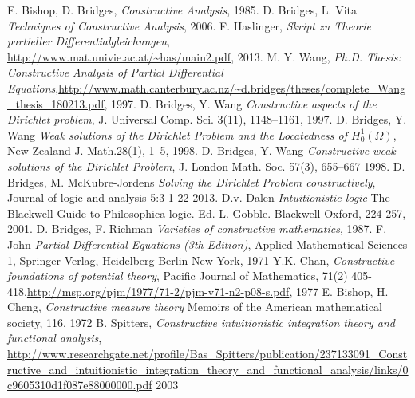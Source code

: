 \documentclass[11pt,a4paper,leqno]{report}
\numberwithin{equation}{chapter}
\begin{document}
\begin{thebibliography}{}
 E. Bishop, D. Bridges, {\em Constructive Analysis}, 1985.
 D. Bridges, L. Vita {\em Techniques of Constructive Analysis}, 2006.
 F. Haslinger, {\em Skript zu Theorie partieller Differentialgleichungen},\\ \url{http://www.mat.univie.ac.at/~has/main2.pdf}, 2013.
 M. Y. Wang, {\em Ph.D. Thesis: Constructive Analysis of Partial Differential Equations},\url{http://www.math.canterbury.ac.nz/~d.bridges/theses/complete_Wang_thesis_180213.pdf}, 1997.
 D. Bridges, Y. Wang {\em Constructive aspects of the Dirichlet problem}, J. Universal Comp. Sci. 3(11), 1148–1161, 1997.
 D. Bridges, Y. Wang {\em Weak solutions of the Dirichlet Problem and the Locatedness of $H^1_0(\Omega)$}, New Zealand J. Math.28(1), 1–5, 1998.
 D. Bridges, Y. Wang {\em Constructive weak solutions of the Dirichlet Problem}, J. London Math. Soc. 57(3), 655–667  1998.
 D. Bridges, M. McKubre-Jordens {\em Solving the Dirichlet Problem constructively}, Journal of logic and analysis 5:3 1-22 2013.
 D.v. Dalen {\em Intuitionistic logic} The Blackwell Guide to Philosophica logic. Ed. L. Gobble. Blackwell Oxford, 224-257, 2001.
 D. Bridges, F. Richman {\em Varieties of constructive mathematics}, 1987.
 F. John {\em Partial Differential Equations (3th Edition)}, Applied Mathematical Sciences 1, Springer-Verlag, Heidelberg-Berlin-New York, 1971
 Y.K. Chan, {\em Constructive foundations of potential theory}, Pacific Journal of Mathematics, 71(2) 405-418,\url{http://msp.org/pjm/1977/71-2/pjm-v71-n2-p08-s.pdf}, 1977
 E. Bishop, H. Cheng, {\em Constructive measure theory} Memoirs of the American mathematical society, 116, 1972
 B. Spitters, {\em Constructive intuitionistic integration theory and functional analysis}, \url{http://www.researchgate.net/profile/Bas_Spitters/publication/237133091_Constructive_and_intuitionistic_integration_theory_and_functional_analysis/links/0c9605310d1f087e88000000.pdf} 2003
\end{thebibliography}
\end{document}
